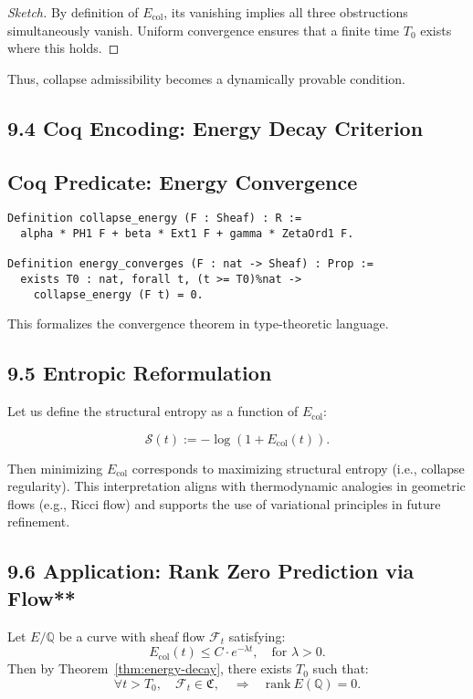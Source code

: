 \documentclass[11pt]{article}
\begin{document}
\begin{proof}[Sketch]
By definition of \( E_{\mathrm{col}} \), its vanishing implies all three obstructions simultaneously vanish. Uniform convergence ensures that a finite time \( T_0 \) exists where this holds.
\end{proof}

Thus, collapse admissibility becomes a dynamically provable condition.

\subsection*{9.4 Coq Encoding: Energy Decay Criterion}

\subsection*{Coq Predicate: Energy Convergence}
\begin{lstlisting}[language=Coq]
Definition collapse_energy (F : Sheaf) : R := 
  alpha * PH1 F + beta * Ext1 F + gamma * ZetaOrd1 F.

Definition energy_converges (F : nat -> Sheaf) : Prop :=
  exists T0 : nat, forall t, (t >= T0)%nat -> 
    collapse_energy (F t) = 0.
\end{lstlisting}

This formalizes the convergence theorem in type-theoretic language.

\subsection*{9.5 Entropic Reformulation}

Let us define the structural entropy as a function of \( E_{\mathrm{col}} \):

\[
\mathcal{S}(t) := -\log \left( 1 + E_{\mathrm{col}}(t) \right).
\]

Then minimizing \( E_{\mathrm{col}} \) corresponds to maximizing structural entropy (i.e., collapse regularity). This interpretation aligns with thermodynamic analogies in geometric flows (e.g., Ricci flow) and supports the use of variational principles in future refinement.

\subsection*{9.6 Application: Rank Zero Prediction via Flow**}

Let \( E/\mathbb{Q} \) be a curve with sheaf flow \( \mathcal{F}_t \) satisfying:
\[
E_{\mathrm{col}}(t) \leq C \cdot e^{-\lambda t}, \quad \text{for } \lambda > 0.
\]
Then by Theorem~\ref{thm:energy-decay}, there exists \( T_0 \) such that:
\[
\forall t > T_0, \quad \mathcal{F}_t \in \mathfrak{C}, \quad \Rightarrow \quad \mathrm{rank}~E(\mathbb{Q}) = 0.
\]
\end{document}
